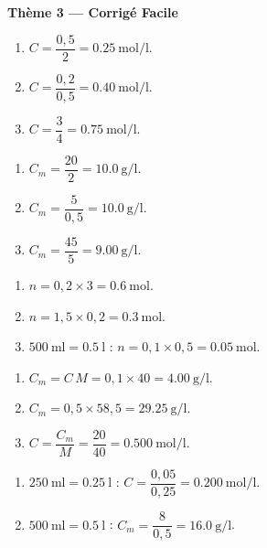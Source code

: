 \documentclass[11pt,a4paper]{article}
\begin{document}
\begin{center}{\large\bfseries\color{primarydark} Thème 3 — Corrigé Facile}\end{center}

\begin{corrige}
\begin{enumerate}[label=\alph*)]
  \item $C = \dfrac{0{,}5}{2} = \SI{0.25}{\mole\per\litre}$.
  \item $C = \dfrac{0{,}2}{0{,}5} = \SI{0.40}{\mole\per\litre}$.
  \item $C = \dfrac{3}{4} = \SI{0.75}{\mole\per\litre}$.
\end{enumerate}
\end{corrige}

\begin{corrige}
\begin{enumerate}[label=\alph*)]
  \item $C_m = \dfrac{20}{2} = \SI{10.0}{\gram\per\litre}$.
  \item $C_m = \dfrac{5}{0{,}5} = \SI{10.0}{\gram\per\litre}$.
  \item $C_m = \dfrac{45}{5} = \SI{9.00}{\gram\per\litre}$.
\end{enumerate}
\end{corrige}

\begin{corrige}
\begin{enumerate}[label=\alph*)]
  \item $n = 0{,}2\times 3 = \SI{0.6}{\mole}$.
  \item $n = 1{,}5\times 0{,}2 = \SI{0.3}{\mole}$.
  \item $\SI{500}{\milli\litre} = \SI{0.5}{\litre}$ : $n = 0{,}1\times 0{,}5 = \SI{0.05}{\mole}$.
\end{enumerate}
\end{corrige}

\begin{corrige}
\begin{enumerate}[label=\alph*)]
  \item $C_m = C\,M = 0{,}1\times 40 = \SI{4.00}{\gram\per\litre}$.
  \item $C_m = 0{,}5\times 58{,}5 = \SI{29.25}{\gram\per\litre}$.
  \item $C = \dfrac{C_m}{M} = \dfrac{20}{40} = \SI{0.500}{\mole\per\litre}$.
\end{enumerate}
\end{corrige}

\begin{corrige}
\begin{enumerate}[label=\alph*)]
  \item $\SI{250}{\milli\litre} = \SI{0.25}{\litre}$ : $C = \dfrac{0{,}05}{0{,}25} = \SI{0.200}{\mole\per\litre}$.
  \item $\SI{500}{\milli\litre} = \SI{0.5}{\litre}$ : $C_m = \dfrac{8}{0{,}5} = \SI{16.0}{\gram\per\litre}$.
\end{enumerate}
\end{corrige}
\end{document}
